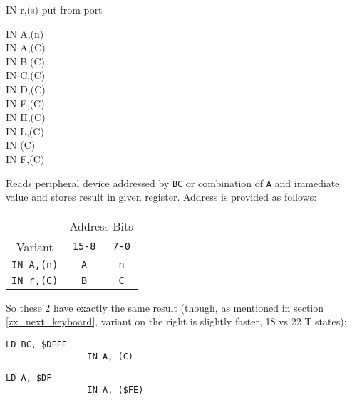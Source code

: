 \begin{basedescript}{
    \desclabelstyle{\multilinelabel}
    \desclabelwidth{3cm}}
    \pagebreak
    \begin{DetailItem}{IN r,(s)}
        {put from port}
        {}

        \begin{DetailVariants}
            IN A,(n)\\
            IN A,(C)\\
            IN B,(C)\\
            IN C,(C)\\
            IN D,(C)\\
            IN E,(C)\\
            IN H,(C)\\
            IN L,(C)\\
            IN (C)\UNDOC\\
            IN F,(C)\UNDOC
        \end{DetailVariants}

        Reads peripheral device addressed by {\tt BC} or combination of {\tt A} and immediate value and stores result in given register. Address is provided as follows:

        \begin{tabular}{ccc}
            & \multicolumn{2}{c}{Address Bits} \\
            Variant & {\tt 15-8} & {\tt 7-0} \\
            \hline
            {\tt IN A,(n)} & {\tt A} & {\tt n} \\
            {\tt IN r,(C)} & {\tt B} & {\tt C} \\
        \end{tabular}
        \vspace{1ex} %

        So these 2 have exactly the same result (though, as mentioned in section \ref{zx_next_keyboard}, variant on the right is slightly faster, 18 vs 22 T states):

        \begin{multicols}{2}
            \begin{lstlisting}[autogobble=true, xrightmargin=1em]
                LD BC, $DFFE
                IN A, (C)
            \end{lstlisting}
            \columnbreak
            \begin{lstlisting}[autogobble=true]
                LD A, $DF
                IN A, ($FE)
            \end{lstlisting}
        \end{multicols}


\end{DetailItem}
\end{basedescript}
